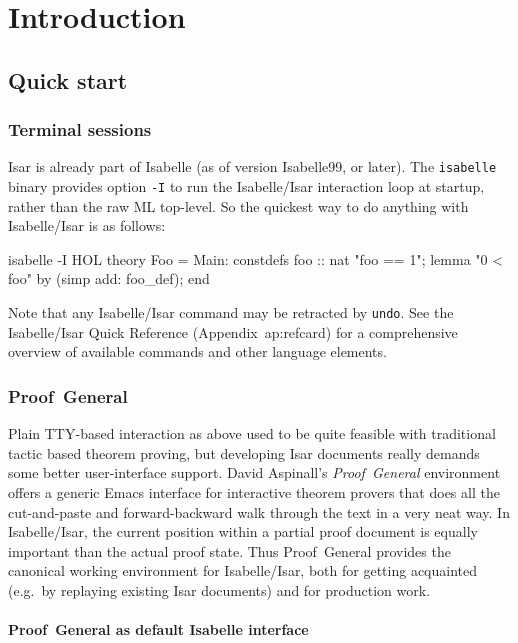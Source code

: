 
\chapter{Introduction}

\section{Quick start}

\subsection{Terminal sessions}

Isar is already part of Isabelle (as of version Isabelle99, or later).  The
\texttt{isabelle} binary provides option \texttt{-I} to run the Isabelle/Isar
interaction loop at startup, rather than the raw ML top-level.  So the
quickest way to do anything with Isabelle/Isar is as follows:
\begin{ttbox}
isabelle -I HOL\medskip
{}\medskip
theory Foo = Main:
constdefs foo :: nat  "foo == 1";
lemma "0 < foo" by (simp add: foo_def);
end
\end{ttbox}
Note that any Isabelle/Isar command may be retracted by \texttt{undo}.  See
the Isabelle/Isar Quick Reference (Appendix~{ap:refcard}) for a comprehensive
overview of available commands and other language elements.


\subsection{Proof~General}

Plain TTY-based interaction as above used to be quite feasible with
traditional tactic based theorem proving, but developing Isar documents really
demands some better user-interface support.  David Aspinall's
\emph{Proof~General} environment
\cite{proofgeneral,Aspinall:TACAS:2000} offers a generic Emacs interface for
interactive theorem provers that does all the cut-and-paste and
forward-backward walk through the text in a very neat way.  In Isabelle/Isar,
the current position within a partial proof document is equally important than
the actual proof state.  Thus Proof~General provides the canonical working
environment for Isabelle/Isar, both for getting acquainted (e.g.\ by replaying
existing Isar documents) and for production work.


\subsubsection{Proof~General as default Isabelle interface}

